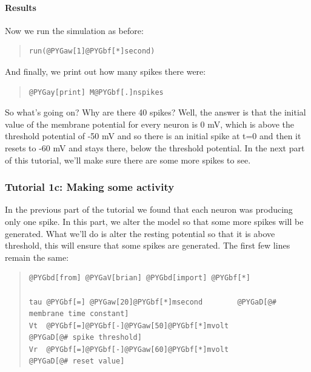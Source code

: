\documentclass[letterpaper,10pt,english]{manual}
\begin{document}
\paragraph{Results}

Now we run the simulation as before:
\begin{quote}

\begin{Verbatim}[commandchars=@\[\]]
run(@PYGaw[1]@PYGbf[*]second)
\end{Verbatim}
\end{quote}

And finally, we print out how many spikes there were:
\begin{quote}

\begin{Verbatim}[commandchars=@\[\]]
@PYGay[print] M@PYGbf[.]nspikes
\end{Verbatim}
\end{quote}

So what's going on? Why are there 40 spikes? Well, the answer is
that the initial value of the membrane potential for every neuron
is 0 mV, which is above the threshold potential of -50 mV and so there
is an initial spike at t=0 and then it resets to -60 mV and stays there,
below the threshold potential. In the next part of this tutorial, we'll
make sure there are some more spikes to see.

\resetcurrentobjects
\hypertarget{--doc-tutorial_1c_making_some_activity}{}

\subsubsection{Tutorial 1c: Making some activity}

In the previous part of the tutorial we found that each neuron
was producing only one spike. In this part, we alter the model so
that some more spikes will be generated. What we'll do is alter
the resting potential  so that it is above threshold, this
will ensure that some spikes are generated. The first few
lines remain the same:
\begin{quote}

\begin{Verbatim}[commandchars=@\[\]]
@PYGbd[from] @PYGaV[brian] @PYGbd[import] @PYGbf[*]

tau @PYGbf[=] @PYGaw[20]@PYGbf[*]msecond        @PYGaD[@# membrane time constant]
Vt  @PYGbf[=]@PYGbf[-]@PYGaw[50]@PYGbf[*]mvolt          @PYGaD[@# spike threshold]
Vr  @PYGbf[=]@PYGbf[-]@PYGaw[60]@PYGbf[*]mvolt          @PYGaD[@# reset value]
\end{Verbatim}
\end{quote}
\end{document}
